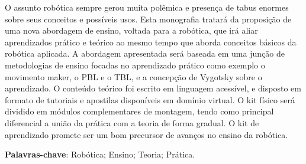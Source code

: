 \begin{thesisresumo}
O assunto robótica sempre gerou muita polêmica e presença de tabus enormes sobre seus conceitos e possíveis usos. Esta monografia tratará da proposição de uma nova abordagem de ensino, voltada para a robótica, que irá aliar aprendizados prático e teórico ao mesmo tempo que aborda conceitos básicos da robótica aplicada. A abordagem apresentada será baseada em uma junção de metodologias de ensino focadas no aprendizado prático como exemplo o movimento maker, o PBL e o TBL, e a concepção de Vygotsky sobre o aprendizado. O conteúdo teórico foi escrito em linguagem acessível, e disposto em formato de tutoriais e apostilas disponíveis em domínio virtual. O kit físico será dividido em módulos complementares de montagem, tendo como principal diferencial a união da prática com a teoria de forma gradual. O kit de aprendizado promete ser um bom precursor de avanços no ensino da robótica.	


\textbf{Palavras-chave}: Robótica; Ensino; Teoria; Prática.

\end{thesisresumo}
